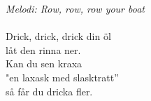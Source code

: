 {\footnotesize\textit{Melodi: Row, row, row your boat}}\\
\\
Drick, drick, drick din öl\\
låt den rinna ner.\\
Kan du sen kraxa\\
"en laxask med slasktratt”\\
så får du dricka fler.
